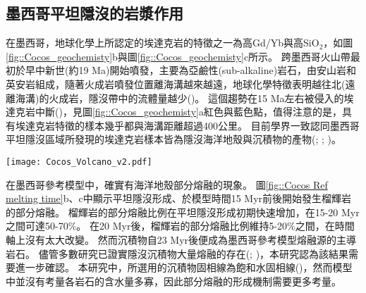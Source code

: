 \subsection{墨西哥平坦隱沒的岩漿作用}
在墨西哥，地球化學上所認定的埃達克岩的特徵之一為高Gd/Yb與高SiO$_2$，如圖\ref{fig::Cocos_geochemisty}b與圖\ref{fig::Cocos_geochemisty}c所示。
跨墨西哥火山帶最初於早中新世(約19 Ma)開始噴發，主要為亞鹼性(sub-alkaline)岩石，由安山岩和英安岩組成，隨著火成岩噴發位置離海溝越來越遠，地球化學特徵表明越往北(遠離海溝)的火成岩，隱沒帶中的流體量越少(\citealp{ferrari2012dynamic})。
這個趨勢在15 Ma左右被侵入的埃達克岩中斷(\citealp{mori2007effects})，見圖\ref{fig::Cocos_geochemisty}a紅色與藍色點，值得注意的是，具有埃達克岩特徵的樣本幾乎都與海溝距離超過400公里。
目前學界一致認同墨西哥平坦隱沒區域所發現的埃達克岩樣本皆為隱沒海洋地殼與沉積物的產物(\citealp{Gutscher2000Bcan}; \citealp{ferrari2012dynamic}; \citealp{Manea2017})。

\begin{figure*}[ht!]
    \centering
    \texttt{[image: Cocos\_Volcano\_v2.pdf]}
    \caption[墨西哥區域火山島弧地球化學分析，摘自\citealp{ferrari2012dynamic}]{墨西哥區域火山島弧地球化學分析，摘自\citealp{ferrari2012dynamic}。白點為距現今火山弧前緣小於150公里的樣本，藍色點為具現今火山弧前緣大於150公里且位在西經99-101$^{\circ}$的樣本，紅色點為具現今火山弧前緣小於150公里且位在西經96.4-99$^{\circ}$的樣本。(a)火成岩樣本年紀與現今海溝距離作圖。(b)火成岩樣本中的SiO$_2$含量與現今海溝距離作圖。(c)火成岩樣本中Gd/Yb比值與現今海溝距離作圖。(d)墨西哥中新世火山位置圖。細虛線表示到海溝的距離，粗虛線是\ref{平坦隱沒中的埃達克岩}圖例中使用的邊界。 CC: Cerro Colorado dome，CG: Cerro Grande volcan塞羅格蘭德火山， LJ: La Joya volcan拉霍亞火山， PH: Palo Huérfano 火山， PS: Palma Sola帕爾馬索拉，SA: Sierra de Angangueo塞拉利昂德安甘格奧， SM: San Martín聖馬丁， SMC: Sierra de Mil Cumbres， T-M: Tenancingo–Malinalco特南寧哥-馬利納爾科， Za: Zamorano volcano薩莫拉諾火山， Zi: Zimapán area Zimapán 地區。
    }
    \label{fig::Cocos_geochemisty}
\end{figure*}

在墨西哥參考模型中，確實有海洋地殼部分熔融的現象。
圖\ref{fig::Cocos Ref melting time}b、c中顯示平坦隱沒形成、於模型時間15 Myr前後開始發生榴輝岩的部分熔融。
榴輝岩的部分熔融比例在平坦隱沒形成初期快速增加，在15-20 Myr之間可達50-70$\%$。
在20 Myr後，榴輝岩的部分熔融比例維持5-20$\%$之間，在時間軸上沒有太大改變。
然而沉積物自23 Myr後便成為墨西哥參考模型熔融源的主導岩石。
儘管多數研究已證實隱沒沉積物大量熔融的存在(\citealp{van2011subduction}; \citealp{Forster2021})，本研究認為該結果需要進一步確認。
本研究中，所選用的沉積物固相線為飽和水固相線(\citealp{van2011subduction})，然而模型中並沒有考量各岩石的含水量多寡，因此部分熔融的形成機制需要更多考量。


